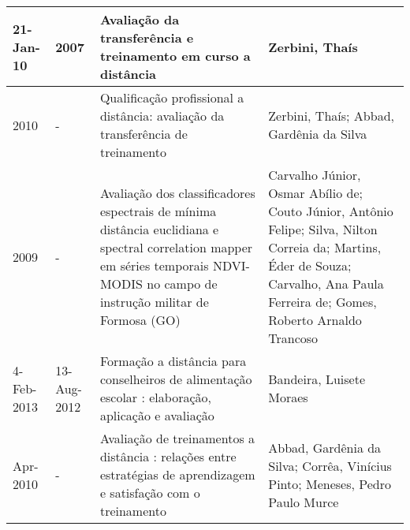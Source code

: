 \begin{table}
{\begin{tabular}{|m{1.3cm}|m{1.3cm}|p{7cm}|p{6cm}|}
21-Jan-10   & 2007        & Avaliação da transferência e treinamento em curso a distância                                                                                                                                                         & Zerbini, Thaís                                                                                                                                                                                                                                               \\ \hline
2010        & -           & Qualificação profissional a distância: avaliação da transferência de treinamento                                                                                                                                      & Zerbini, Thaís; Abbad, Gardênia da Silva                                                                                                                                                                                                                     \\ \hline
2009        & -           & Avaliação dos classificadores espectrais de mínima distância euclidiana e spectral correlation mapper em séries temporais NDVI-MODIS no campo de instrução militar de Formosa (GO)                                    & Carvalho Júnior, Osmar Abílio de; Couto Júnior, Antônio Felipe; Silva, Nilton Correia da; Martins, Éder de Souza; Carvalho, Ana Paula Ferreira de; Gomes, Roberto Arnaldo Trancoso                                                                           \\ \hline
4-Feb-2013  & 13-Aug-2012 & Formação a distância para conselheiros de alimentação escolar : elaboração, aplicação e avaliação                                                                                                                     & Bandeira, Luisete Moraes                                                                                                                                                                                                                                     \\ \hline
Apr-2010    & -           & Avaliação de treinamentos a distância : relações entre estratégias de aprendizagem e satisfação com o treinamento                                                                                                     & Abbad, Gardênia da Silva; Corrêa, Vinícius Pinto; Meneses, Pedro Paulo Murce                                                                                                                                                                                 \\ \hline

\end{tabular}}
\end{table}

